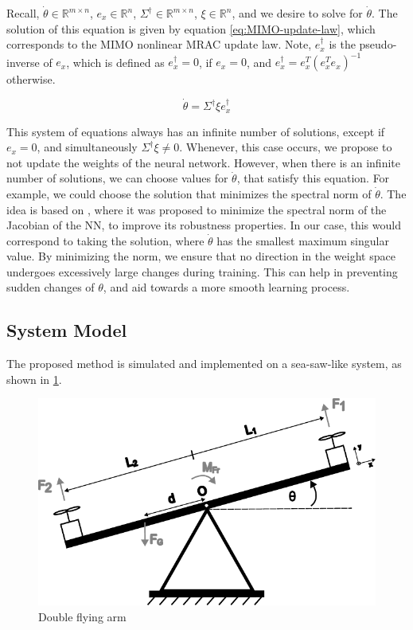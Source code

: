 Recall, $\dot\theta\in\mathbb{R}^{m\times n}$, $e_x \in\mathbb{R}^{n}$, $\Sigma^{\dagger}\in\mathbb{R}^{m\times n}$, $\xi\in\mathbb{R}^{n}$, and we desire to solve for $\dot\theta$. The solution of this equation is given by equation \eqref{eq:MIMO-update-law}, which corresponds to the MIMO nonlinear MRAC update law. Note, $e_x^{\dagger}$ is the pseudo-inverse of $e_x$, which is defined as $e_x^{\dagger}=0$, if $e_x=0$, and $e_x^{\dagger}=e_x^T(e_x^Te_x)^{-1}$ otherwise.

\begin{equation}
\dot\theta =\Sigma^{\dagger}\xi e_x^{\dagger}
    \label{eq:MIMO-update-law}
\end{equation}

This system of equations always has an infinite number of solutions, except if  $e_x=0$, and simultaneously $\Sigma^{\dagger}\xi\neq 0$. Whenever, this case occurs, we propose to not update the weights of the neural network. However, when there is an infinite number of solutions, we can choose values for $\dot\theta$, that satisfy this equation. For example, we could choose the solution that minimizes the spectral norm of $\dot\theta$. The idea is based on \cite{yoshida2017spectralnormregularizationimproving, johansson_improved_2023}, where it was proposed to minimize the spectral norm of the Jacobian of the NN, to improve its robustness properties. In our case, this would correspond to taking the solution, where $\dot\theta$ has the smallest maximum singular value. By minimizing the norm, we ensure that no direction in the weight space undergoes excessively large changes during training. This can help in preventing sudden changes of $\theta$, and aid towards a more smooth learning process.

\subsection{System Model}
\label{sec:system}
The proposed method is simulated and implemented on a sea-saw-like system, as shown in \cref{fig:flying-arm}. 

\begin{figure}
    \includegraphics[width=\linewidth]{images/DoubleFlyingArm.pdf}
    \caption{Double flying arm}
    \label{fig:flying-arm}
\end{figure}

